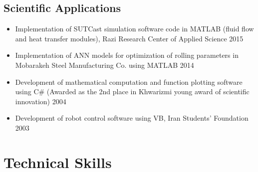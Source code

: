 \documentclass{cv}
\begin{document}
\subsection{Scientific Applications}

\begin{itemize}
\item
Implementation of SUTCast simulation software code in MATLAB (fluid flow and heat transfer modules), Razi Research Center of Applied Science \hfill 2015
\item
Implementation of ANN models for optimization of rolling parameters in Mobarakeh Steel Manufacturing Co. using MATLAB \hfill 2014
\item
Development of mathematical computation and function plotting software using C\# (Awarded as the 2nd place in Khwarizmi young award of scientific innovation) \hfill 2004
\item
Development of robot control software using VB, Iran Students' Foundation \hfill 2003

\end{itemize}



\section{Technical Skills}
\end{document}

